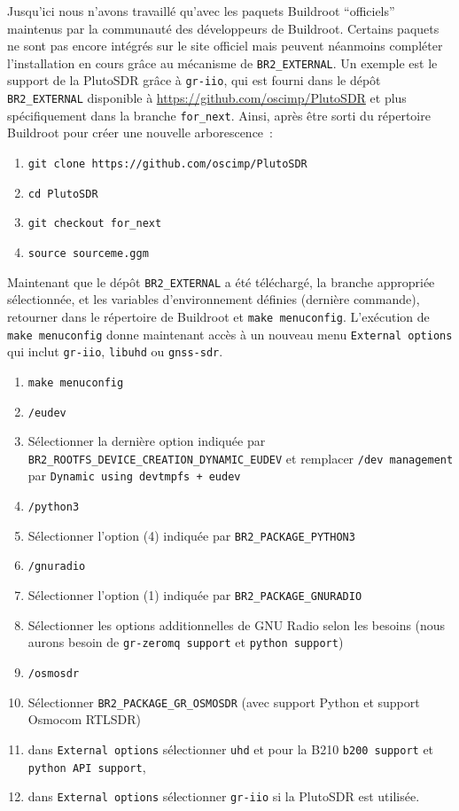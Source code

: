 \documentclass[a4paper]{article}
\begin{document}
Jusqu'ici nous n'avons travaill\'e qu'avec les paquets Buildroot ``officiels'' maintenus
par la communaut\'e des d\'eveloppeurs de Buildroot. Certains paquets ne sont pas encore
int\'egr\'es sur le site officiel mais peuvent n\'eanmoins compl\'eter l'installation
en cours gr\^ace au m\'ecanisme de {\tt BR2\_EXTERNAL}. Un exemple est le support
de la PlutoSDR gr\^ace \`a {\tt gr-iio}, qui est fourni dans le d\'ep\^ot {\tt BR2\_EXTERNAL} 
disponible \`a \url{https://github.com/oscimp/PlutoSDR} et plus sp\'ecifiquement dans la branche 
{\tt for\_next}. Ainsi, apr\`es \^etre sorti du r\'epertoire Buildroot pour cr\'eer une nouvelle
arborescence~:
\begin{enumerate}
\item \verb~git clone https://github.com/oscimp/PlutoSDR~
\item \verb~cd PlutoSDR~
\item \verb~git checkout for_next~
\item \verb~source sourceme.ggm~
\end{enumerate}

Maintenant que le d\'ep\^ot {\tt BR2\_EXTERNAL} a \'et\'e t\'el\'echarg\'e, la branche
appropri\'ee s\'electionn\'ee, et les variables d'environnement d\'efinies (derni\`ere commande), 
retourner dans le r\'epertoire de Buildroot et 
{\tt make menuconfig}. L'ex\'ecution de {\tt make menuconfig} donne maintenant acc\`es \`a un nouveau menu
{\tt External options} qui inclut
{\tt gr-iio}, {\tt libuhd} ou {\tt gnss-sdr}. 

\begin{enumerate}
\item \verb~make menuconfig~
\item \verb~/eudev~
\item S\'electionner la derni\`ere option indiqu\'ee par {\tt BR2\_ROOTFS\_DEVICE\_CREATION\_DYNAMIC\_EUDEV} et
remplacer {\tt /dev management} par {\tt Dynamic using devtmpfs + eudev}
\item \verb~/python3~
\item S\'electionner l'option (4) indiqu\'ee par {\tt BR2\_PACKAGE\_PYTHON3}
\item \verb~/gnuradio~
\item S\'electionner l'option (1) indiqu\'ee par {\tt BR2\_PACKAGE\_GNURADIO}
\item S\'electionner les options additionnelles de GNU Radio selon les besoins (nous aurons besoin
de {\tt gr-zeromq support} et {\tt python support})
\item \verb~/osmosdr~
\item S\'electionner {\tt BR2\_PACKAGE\_GR\_OSMOSDR} (avec support Python et support Osmocom RTLSDR)
\item dans {\tt External options} s\'electionner {\tt uhd} et pour la B210 {\tt b200 support} et 
{\tt python API support}, 
\item dans {\tt External options} s\'electionner {\tt gr-iio} si la PlutoSDR est utilis\'ee.
\end{enumerate}
\end{document}
